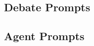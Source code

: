 \newpage
\subsection{Debate Prompts}
\label{app:debate_prompts}


\newpage
\subsection{Agent Prompts}
\label{app:agent_prompts}


